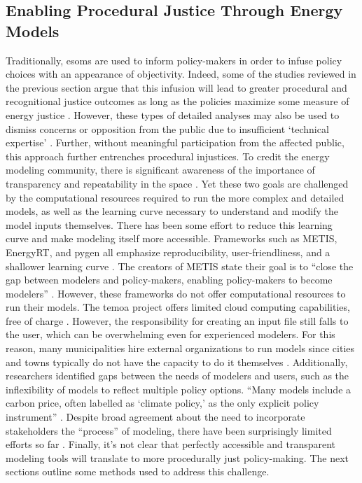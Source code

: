\subsection{Enabling Procedural Justice Through Energy Models}

Traditionally, \acp{esom} are used to inform policy-makers \cite{li_open_2020}
in order to infuse policy choices with an appearance of objectivity. Indeed,
some of the studies reviewed in the previous section argue that this infusion
will lead to greater procedural and recognitional justice outcomes as long as
the policies maximize some measure of energy justice
\cite{chapman_prioritizing_2018, heffron_resolving_2015}. However, these types
of detailed analyses may also be used to dismiss concerns or opposition from the
public due to insufficient `technical expertise' \cite{johnson_dakota_2021,
susser_better_2022}. Further, without meaningful participation from the affected
public, this approach further entrenches procedural injustices. To credit the
energy modeling community, there is significant awareness of the importance of
transparency and repeatability in the space \cite{decarolis_case_2012,
pfenninger_energy_2014, pfenninger_openmod_2022, forster_open_2022,
hilpert_open_2018}. Yet these two goals are challenged by the computational
resources required to run the more complex and detailed models, as well as the
learning curve necessary to understand and modify the model inputs themselves.
There has been some effort to reduce this learning curve and make modeling
itself more accessible. Frameworks such as METIS, EnergyRT, and \ac{pygen} all
emphasize reproducibility, user-friendliness, and a shallower learning curve
\cite{sakellaris_metis_2018, lugovoy_energyrt_2022, dotson_python_2021}. The
creators of METIS state their goal is to ``close the gap between modelers and
policy-makers, enabling policy-makers to become modelers''
\cite{sakellaris_metis_2018}. However, these frameworks do not offer
computational resources to run their models. The \ac{temoa} project offers
limited cloud computing capabilities, free of charge
\cite{temoa_project_temoa_2023}. However, the responsibility for creating an
input file still falls to the user, which can be overwhelming even for
experienced modelers. For this reason, many municipalities hire external
organizations to run models since cities and towns typically do not have the
capacity to do it themselves \cite{ben_amer_too_2020, johannsen_designing_2021}.
Additionally, researchers identified gaps between the needs of modelers and
users, such as the inflexibility of models to reflect multiple policy options.
``Many models include a carbon price, often labelled as `climate policy,' as the
only explicit policy instrument'' \cite{susser_better_2022}. Despite broad
agreement about the need to incorporate stakeholders the ``process'' of
modeling, there have been surprisingly limited efforts so far
\cite{ben_amer_too_2020,johannsen_designing_2021,susser_better_2022}. Finally,
it's not clear that perfectly accessible and transparent modeling tools will
translate to more procedurally just policy-making. The next sections outline
some methods used to address this challenge.

